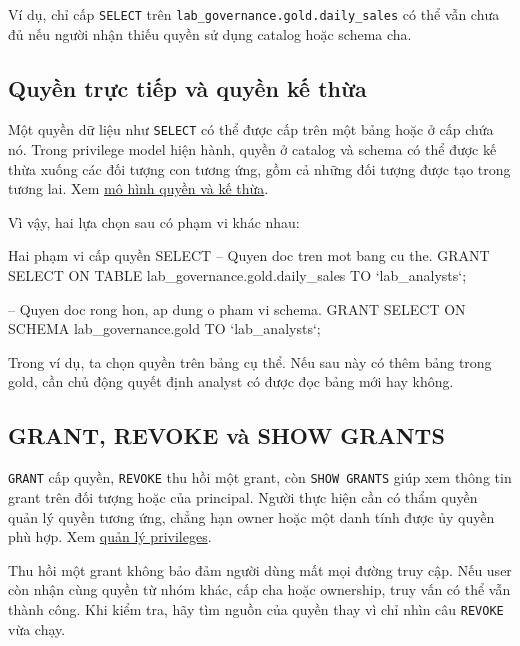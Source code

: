 Ví dụ, chỉ cấp \texttt{SELECT} trên \texttt{lab\_\allowbreak{}governance.\allowbreak{}gold.\allowbreak{}daily\_\allowbreak{}sales} có thể vẫn chưa đủ nếu người nhận thiếu quyền sử dụng catalog hoặc schema cha.


\FloatBarrier
{}
\subsection{Quyền trực tiếp và quyền kế thừa}

Một quyền dữ liệu như \texttt{SELECT} có thể được cấp trên một bảng hoặc ở cấp chứa nó. Trong privilege model hiện hành, quyền ở catalog và schema có thể được kế thừa xuống các đối tượng con tương ứng, gồm cả những đối tượng được tạo trong tương lai. Xem \href{https://docs.databricks.com/aws/en/data-governance/unity-catalog/access-control/permissions-concepts}{mô hình quyền và kế thừa}.


Vì vậy, hai lựa chọn sau có phạm vi khác nhau:


\begin{aivncodebox}[language=SQL]{Hai phạm vi cấp quyền SELECT}
-- Quyen doc tren mot bang cu the.
GRANT SELECT ON TABLE lab_governance.gold.daily_sales
TO `lab_analysts`;

-- Quyen doc rong hon, ap dung o pham vi schema.
GRANT SELECT ON SCHEMA lab_governance.gold
TO `lab_analysts`;
\end{aivncodebox}

Trong ví dụ, ta chọn quyền trên bảng cụ thể. Nếu sau này có thêm bảng trong gold, cần chủ động quyết định analyst có được đọc bảng mới hay không.


\FloatBarrier
{}
\subsection{GRANT, REVOKE và SHOW GRANTS}

\texttt{GRANT} cấp quyền, \texttt{REVOKE} thu hồi một grant, còn \texttt{SHOW GRANTS} giúp xem thông tin grant trên đối tượng hoặc của principal. Người thực hiện cần có thẩm quyền quản lý quyền tương ứng, chẳng hạn owner hoặc một danh tính được ủy quyền phù hợp. Xem \href{https://docs.databricks.com/aws/en/data-governance/unity-catalog/manage-privileges/}{quản lý privileges}.


Thu hồi một grant không bảo đảm người dùng mất mọi đường truy cập. Nếu user còn nhận cùng quyền từ nhóm khác, cấp cha hoặc ownership, truy vấn có thể vẫn thành công. Khi kiểm tra, hãy tìm nguồn của quyền thay vì chỉ nhìn câu \texttt{REVOKE} vừa chạy.


